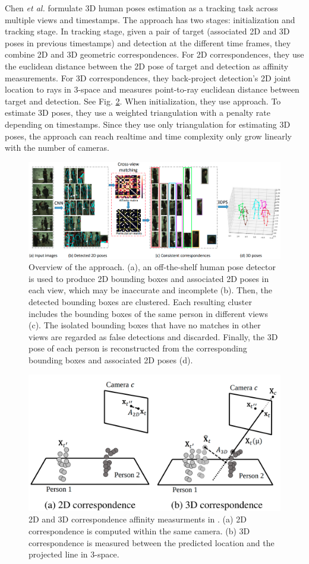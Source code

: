 Chen \textit{et al.} \cite{Chen_2020_CVPR} formulate 3D human poses estimation as a tracking task across multiple views and timestamps. The approach has two stages: initialization and tracking stage. In tracking stage, given a pair of target (associated 2D and 3D poses in previous timestamps) and detection at the different time frames, they combine 2D and 3D geometric correspondences. For 2D correspondences, they use the euclidean distance between the 2D pose of target and detection as affinity measurements. For 3D correspondences, they back-project detection's 2D joint location to rays in 3-space and measures point-to-ray euclidean distance between target and detection. See Fig. \ref{fig:ch3-cheng}. When initialization, they use \cite{dong2019fast} approach. To estimate 3D poses, they use a weighted triangulation with a penalty rate depending on timestamps. Since they use only triangulation for estimating 3D poses, the approach can reach realtime and time complexity only grow linearly with the number of cameras.
\begin{figure}
	\centering
	\includegraphics[width=0.7\columnwidth]{figures/ch3/dong-fast-cross-view-matching.png}
	\caption{Overview of the \cite{dong2019fast} approach. (a), an off-the-shelf human pose detector is used to produce 2D bounding boxes and associated 2D poses in each view, which may be inaccurate and incomplete (b). Then, the detected bounding boxes are clustered. Each resulting cluster includes the bounding boxes of the same person in different views (c). The isolated bounding boxes that have no matches in other views are regarded as false detections and discarded. Finally, the 3D pose of each person is reconstructed from the corresponding bounding boxes and associated 2D poses (d).} 
	\label{fig:ch3-dong-fast-cross-view-matching}
\end{figure}
\begin{figure}
	\centering
	\includegraphics[width=0.7\columnwidth]{figures/ch3/chen-correspondence.png}
	\caption{2D and 3D correspondence affinity measurments in \cite{Chen_2020_CVPR}. (a) 2D correspondence is computed within the same camera. (b) 3D correspondence is measured between the predicted location and the projected line in 3-space.} 
	\label{fig:ch3-cheng}
\end{figure}
